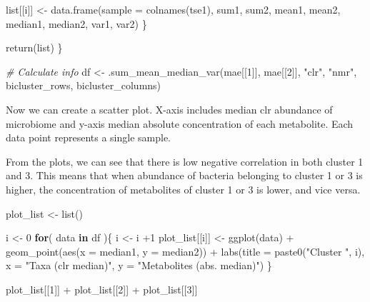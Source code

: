 \documentclass[
]{book}
\newenvironment{Shaded}{\begin{snugshade}}{\end{snugshade}}
\newcommand{\AttributeTok}[1]{\textcolor[rgb]{0.77,0.63,0.00}{#1}}
\newcommand{\CommentTok}[1]{\textcolor[rgb]{0.56,0.35,0.01}{\textit{#1}}}
\newcommand{\ControlFlowTok}[1]{\textcolor[rgb]{0.13,0.29,0.53}{\textbf{#1}}}
\newcommand{\DecValTok}[1]{\textcolor[rgb]{0.00,0.00,0.81}{#1}}
\newcommand{\FunctionTok}[1]{\textcolor[rgb]{0.00,0.00,0.00}{#1}}
\newcommand{\NormalTok}[1]{#1}
\newcommand{\OtherTok}[1]{\textcolor[rgb]{0.56,0.35,0.01}{#1}}
\newcommand{\SpecialCharTok}[1]{\textcolor[rgb]{0.00,0.00,0.00}{#1}}
\newcommand{\StringTok}[1]{\textcolor[rgb]{0.31,0.60,0.02}{#1}}
\begin{document}
\begin{Shaded}
\begin{Highlighting}[]
\NormalTok{    list[[i]] }\OtherTok{\textless{}{-}} \FunctionTok{data.frame}\NormalTok{(}\AttributeTok{sample =} \FunctionTok{colnames}\NormalTok{(tse1), sum1, sum2, mean1, mean2, }
\NormalTok{                     median1, median2, var1, var2)}
\NormalTok{  \}}

  \FunctionTok{return}\NormalTok{(list)}
\NormalTok{\}}

\CommentTok{\# Calculate info}
\NormalTok{df }\OtherTok{\textless{}{-}} \FunctionTok{.sum\_mean\_median\_var}\NormalTok{(mae[[}\DecValTok{1}\NormalTok{]], mae[[}\DecValTok{2}\NormalTok{]], }\StringTok{"clr"}\NormalTok{, }\StringTok{"nmr"}\NormalTok{, bicluster\_rows, bicluster\_columns)}
\end{Highlighting}
\end{Shaded}

Now we can create a scatter plot. X-axis includes median clr abundance of microbiome
and y-axis median absolute concentration of each metabolite. Each data point represents
a single sample.

From the plots, we can see that there is low negative correlation in both cluster 1 and 3.
This means that when abundance of bacteria belonging to cluster 1 or 3 is higher,
the concentration of metabolites of cluster 1 or 3 is lower, and vice versa.

\begin{Shaded}
\begin{Highlighting}[]
\NormalTok{plot\_list }\OtherTok{\textless{}{-}} \FunctionTok{list}\NormalTok{()}

\NormalTok{i }\OtherTok{\textless{}{-}} \DecValTok{0}
\ControlFlowTok{for}\NormalTok{( data }\ControlFlowTok{in}\NormalTok{ df )\{}
\NormalTok{  i }\OtherTok{\textless{}{-}}\NormalTok{ i }\SpecialCharTok{+}\DecValTok{1}
\NormalTok{  plot\_list[[i]] }\OtherTok{\textless{}{-}} \FunctionTok{ggplot}\NormalTok{(data)  }\SpecialCharTok{+}
      \FunctionTok{geom\_point}\NormalTok{(}\FunctionTok{aes}\NormalTok{(}\AttributeTok{x =}\NormalTok{ median1, }\AttributeTok{y =}\NormalTok{ median2)) }\SpecialCharTok{+} 
    \FunctionTok{labs}\NormalTok{(}\AttributeTok{title =} \FunctionTok{paste0}\NormalTok{(}\StringTok{"Cluster "}\NormalTok{, i), }\AttributeTok{x =} \StringTok{"Taxa (clr median)"}\NormalTok{, }\AttributeTok{y =} \StringTok{"Metabolites (abs. median)"}\NormalTok{)}
\NormalTok{\}}

\NormalTok{plot\_list[[}\DecValTok{1}\NormalTok{]] }\SpecialCharTok{+}\NormalTok{ plot\_list[[}\DecValTok{2}\NormalTok{]] }\SpecialCharTok{+}\NormalTok{ plot\_list[[}\DecValTok{3}\NormalTok{]]}
\end{Highlighting}
\end{Shaded}
\end{document}
